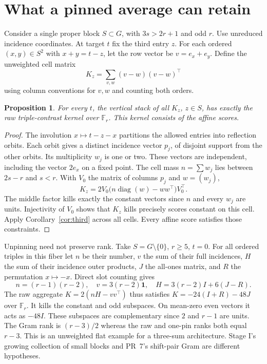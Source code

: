 \documentclass[11pt]{article}
\newtheorem{proposition}[theorem]{Proposition}
\newcommand{\F}{\mathbb F}
\begin{document}
\section{What a pinned average can retain}
Consider a single proper block $S\subset G$, with $3s>2r+1$ and odd $r$. Use unreduced incidence coordinates. At target $t$ fix the third entry $z$. For each ordered $(x,y)\in S^2$ with $x+y=t-z$, let the row vector be $v=e_x+e_y$. Define the unweighted cell matrix
\[
 K_z=\sum_{v,w}(v-w)(v-w)^\top
\]
using column conventions for $v,w$ and counting both orders.
\begin{proposition}\label{prop:pin}
For every $t$, the vertical stack of all $K_z$, $z\in S$, has exactly the raw triple-contrast kernel over $\F_r$. This kernel consists of the affine scores.
\end{proposition}
\begin{proof}
The involution $x\mapsto t-z-x$ partitions the allowed entries into reflection orbits. Each orbit gives a distinct incidence vector $p_j$, of disjoint support from the other orbits. Its multiplicity $w_j$ is one or two. These vectors are independent, including the vector $2e_x$ on a fixed point. The cell mass $n=\sum w_j$ lies between $2s-r$ and $s<r$. With $V_0$ the matrix of columns $p_j$ and $w=(w_j)$,
\[
 K_z=2V_0\big(n\operatorname{diag}(w)-ww^\top\big)V_0^\top .
\]
The middle factor kills exactly the constant vectors since $n$ and every $w_j$ are units. Injectivity of $V_0$ shows that $K_z$ kills precisely scores constant on this cell. Apply Corollary~\ref{cor:third} across all cells. Every affine score satisfies those constraints.
\end{proof}

Unpinning need not preserve rank. Take $S=G\setminus\{0\}$, $r\ge5$, $t=0$. For all ordered triples in this fiber let $n$ be their number, $v$ the sum of their full incidences, $H$ the sum of their incidence outer products, $J$ the all-ones matrix, and $R$ the permutation $x\mapsto-x$. Direct slot counting gives
\[
 n=(r-1)(r-2),\quad v=3(r-2)\mathbf1,\quad H=3(r-2)I+6(J-R).
\]
The raw aggregate $K=2(nH-vv^\top)$ thus satisfies $K=-24(I+R)-48J$ over $\F_r$. It kills the constant and odd subspaces. On mean-zero even vectors it acts as $-48I$. These subspaces are complementary since $2$ and $r-1$ are units. The Gram rank is $(r-3)/2$ whereas the raw and one-pin ranks both equal $r-3$. This is an unweighted flat example for a three-sum architecture. Stage I's growing collection of small blocks and PR~7's shift-pair Gram are different hypotheses.
\end{document}
